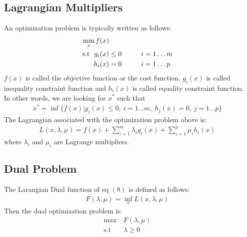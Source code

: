\documentclass[11pt, a4paper]{article}
\begin{document}
\subsection{Lagrangian Multipliers}
An optimization problem is typically written as follows:
\begin{align*}
\min_x f(x)&\\
\text{s.t}\ \ g_i(x) &\le 0\hspace*{1cm} i = 1\ldots m\\
h_i(x) &= 0\hspace*{1cm} i = 1\ldots p\
\end{align*}
$f(x)$ is called the objective function or the cost function, $g_i(x)$ is called inequality constraint function and $h_i(x)$ is called equality constraint function. In other words, we are looking for $x^*$ such that\begin{align*}
x^* = \inf\{f(x)| g_i(x) \le 0,\ i = 1\ldots m,\ h_j(x) = 0,\ j = 1\ldots p\}
\end{align*}
The Lagrangian associated with the optimization problem above is:
\begin{align}
L(x, \lambda, \mu) = f(x) + \sum_{i = 1}^m \lambda_i g_i(x) + \sum_{i = 1}^p \mu_i h_i(x)
\end{align}
where $\lambda_i$ and $\mu_i$ are Lagrange multipliers.
\subsection{Dual Problem}
The Larangian Dual function of eq $(8)$ is defined as follows:
\begin{align}
F(\lambda,\mu) = \inf_x L(x,\lambda,\mu)
\end{align}
Then the dual optimization problem is:\begin{align*}
\max\ &F(\lambda,\mu)\\
\text{s.t}\ &\lambda \ge 0
\end{align*}
\end{document}
